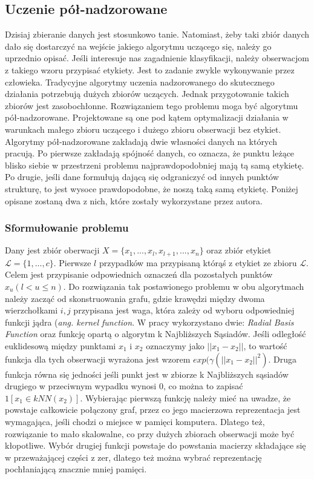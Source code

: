 \documentclass{article}
\begin{document}
\subsection{Uczenie pół-nadzorowane}
Dzisiaj zbieranie danych jest stosunkowo tanie.
Natomiast, żeby taki zbiór danych dało się dostarczyć na wejście jakiego algorytmu uczącego się, należy go uprzednio opisać.
Jeśli interesuje nas zagadnienie klasyfikacji, należy obserwacjom z takiego wzoru przypisać etykiety.
Jest to zadanie zwykle wykonywanie przez człowieka.
Tradycyjne algorytmy uczenia nadzorowanego do skutecznego działania potrzebują dużych zbiorów uczących. 
Jednak przygotowanie takich zbiorów jest zasobochłonne.
Rozwiązaniem tego problemu moga być algorytmu pół-nadzorowane.
Projektowane są one pod kątem optymalizacji działania w warunkach małego zbioru uczącego i dużego zbioru obserwacji bez etykiet.
Algorytmy pół-nadzorowane zakładają dwie własności danych na których pracują.
Po pierwsze zakładają spójność danych, co oznacza, że punktu leżące blisko siebie w przestrzeni problemu najprawdopodobniej mają tą samą etykietę.
Po drugie, jeśli dane formułują dającą się odgraniczyć od innych punktów strukturę, to jest wysoce prawdopodobne, że noszą taką samą etykietę\cite{Zhou2004}.
Poniżej opisane zostaną dwa z nich, które zostały wykorzystane przez autora.
\subsubsection{Sformułowanie problemu}
Dany jest zbiór oberwacji \(X = \{x_1, ..., x_l, x_{l+1}, ..., x_n\}\) oraz zbiór etykiet \(\mathcal{L} = \{1, ... ,c\}\).
Pierwsze \(l\) przypadków ma przypisaną którąś z etykiet ze zbioru \(\mathcal{L}\). Celem jest przypisanie odpowiednich oznaczeń dla pozostałych punktów \(x_u(l  < u \leqslant n)\).
Do rozwiązania tak postawionego problemu w obu algorytmach należy zacząć od skonstruowania grafu, gdzie krawędzi między dwoma wierzchołkami \(i, j\) przypisana jest waga, która zależy od wyboru odpowiedniej funkcji jądra (\emph{ang. kernel function}. W pracy wykorzystano dwie: \emph{Radial Basis Function} oraz funkcję opartą o algorytm k Najbliższych Sąsiadów. Jeśli odległość euklidesową między punktami \(x_1\) i \(x_2\) oznaczymy jako \(||x_1 - x_2||\), to wartość funkcja dla tych obserwacji wyrażona jest wzorem \(exp(\gamma(||x_1 - x_2||^2)\).
Druga funkcja równa się jedności jeśli punkt jest w zbiorze k Najbliższych sąsiadów drugiego w przeciwnym wypadku wynosi 0, co można to zapisać \(1[x_1 \in kNN(x_2)]\). 
Wybierając pierwszą funkcję należy mieć na uwadze, że powstaje całkowicie połączony graf, przez co jego macierzowa reprezentacja jest wymagająca, jeśli chodzi o miejsce w pamięci komputera.
Dlatego też, rozwiązanie to mało skalowalne, co przy dużych zbiorach obserwacji może być kłopotliwe.
Wybór drugiej funkcji powstaje do powstania macierzy składające się w przeważającej części z zer, dlatego też można wybrać reprezentację pochłaniającą znacznie mniej pamięci.
\end{document}
